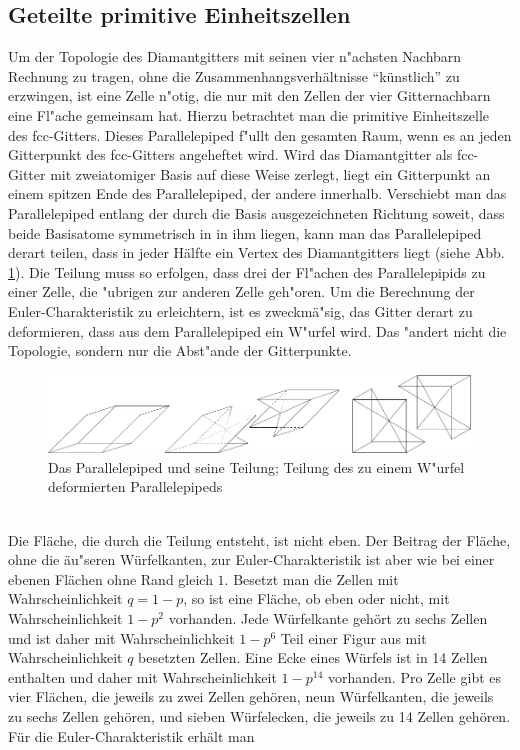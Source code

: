 \subsection {Geteilte primitive Einheitszellen}
\label{sec:appdiamantnonconvex}
Um der Topologie des Diamantgitters mit seinen vier n"achsten 
Nachbarn Rechnung zu tragen, ohne die Zusammenhangsverh\"altnisse ``k\"unstlich'' zu erzwingen, ist eine Zelle n"otig, die nur mit 
den Zellen der vier Gitternachbarn eine Fl"ache gemeinsam hat. 
Hierzu betrachtet man die primitive Einheitszelle des fcc-Gitters. 
Dieses Parallelepiped f"ullt den gesamten Raum, wenn es an jeden 
Gitterpunkt des fcc-Gitters angeheftet wird. Wird das Diamantgitter 
als fcc-Gitter mit zweiatomiger Basis auf diese Weise zerlegt, 
liegt ein Gitterpunkt an einem spitzen Ende des Parallelepiped, der andere 
innerhalb. Verschiebt man das Parallelepiped  entlang der durch die Basis 
ausgezeichneten Richtung soweit, dass beide Basisatome symmetrisch in 
in ihm liegen, kann man das Parallelepiped derart teilen, dass in jeder H\"alfte ein Vertex des Diamantgitters liegt (siehe Abb. \ref{fig:appdiazelle}). Die Teilung muss so 
erfolgen, dass drei der Fl"achen des Parallelepipids zu einer 
Zelle, die "ubrigen zur anderen Zelle geh"oren. Um die 
Berechnung der Euler-Charakteristik zu erleichtern, ist es zweckm\"a"sig, das 
Gitter derart zu deformieren, dass aus dem Parallelepiped ein 
W"urfel wird. Das "andert nicht die Topologie, sondern nur die 
Abst"ande der Gitterpunkte.
\begin{figure}[htbp]
\begin{center}
\includegraphics{./Fluct_topo-Figs/geteilte_zelle}
\caption{Das Parallelepiped und seine Teilung; Teilung des zu einem W"urfel deformierten Parallelepipeds}
\label{fig:appdiazelle}
\end{center}
\end{figure}
\\Die Fl\"ache, die durch die Teilung entsteht, ist nicht eben. Der Beitrag der Fl\"ache, ohne die \"au"seren W\"urfelkanten, zur Euler-Charakteristik ist aber wie bei einer ebenen Fl\"achen ohne Rand gleich $1$. Besetzt man die Zellen mit Wahrscheinlichkeit $q=1-p$, so ist eine Fl\"ache, ob eben oder nicht, mit Wahrscheinlichkeit $1-p^2$ vorhanden. Jede W\"urfelkante geh\"ort zu sechs Zellen und ist daher mit Wahrscheinlichkeit $1-p^6$ Teil einer Figur aus mit Wahrscheinlichkeit $q$ besetzten Zellen. Eine Ecke eines W\"urfels ist in 14 Zellen enthalten und daher mit Wahrscheinlichkeit $1-p^{14}$ vorhanden. Pro Zelle gibt es vier Fl\"achen, die jeweils zu zwei Zellen geh\"oren, neun W\"urfelkanten, die jeweils zu sechs Zellen geh\"oren, und sieben W\"urfelecken, die jeweils zu 14 Zellen geh\"oren. F\"ur die Euler-Charakteristik erh\"alt man
